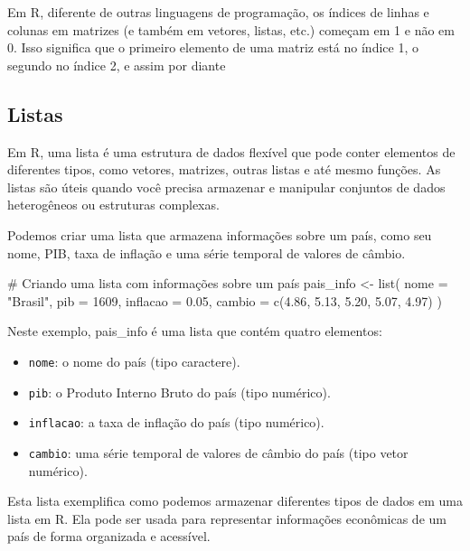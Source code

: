 \documentclass[
  portuguese,
  letterpaper,
  DIV=11,
  numbers=noendperiod]{scrreprt}
\newenvironment{Shaded}{\begin{snugshade}}{\end{snugshade}}
\newcommand{\AttributeTok}[1]{\textcolor[rgb]{0.40,0.45,0.13}{#1}}
\newcommand{\CommentTok}[1]{\textcolor[rgb]{0.37,0.37,0.37}{#1}}
\newcommand{\DecValTok}[1]{\textcolor[rgb]{0.68,0.00,0.00}{#1}}
\newcommand{\FloatTok}[1]{\textcolor[rgb]{0.68,0.00,0.00}{#1}}
\newcommand{\FunctionTok}[1]{\textcolor[rgb]{0.28,0.35,0.67}{#1}}
\newcommand{\NormalTok}[1]{\textcolor[rgb]{0.00,0.23,0.31}{#1}}
\newcommand{\OtherTok}[1]{\textcolor[rgb]{0.00,0.23,0.31}{#1}}
\newcommand{\StringTok}[1]{\textcolor[rgb]{0.13,0.47,0.30}{#1}}
\providecommand{\tightlist}{%
  \setlength{\itemsep}{0pt}\setlength{\parskip}{0pt}}
\theoremstyle{definition}
\theoremstyle{remark}
\begin{document}
Em R, diferente de outras linguagens de programação, os índices de
linhas e colunas em matrizes (e também em vetores, listas, etc.) começam
em 1 e não em 0. Isso significa que o primeiro elemento de uma matriz
está no índice 1, o segundo no índice 2, e assim por diante

\subsection{Listas}\label{listas}

Em R, uma lista é uma estrutura de dados flexível que pode conter
elementos de diferentes tipos, como vetores, matrizes, outras listas e
até mesmo funções. As listas são úteis quando você precisa armazenar e
manipular conjuntos de dados heterogêneos ou estruturas complexas.

Podemos criar uma lista que armazena informações sobre um país, como seu
nome, PIB, taxa de inflação e uma série temporal de valores de câmbio.

\begin{Shaded}
\begin{Highlighting}[]
\CommentTok{\# Criando uma lista com informações sobre um país}
\NormalTok{pais\_info }\OtherTok{\textless{}{-}} \FunctionTok{list}\NormalTok{(}
  \AttributeTok{nome =} \StringTok{"Brasil"}\NormalTok{,}
  \AttributeTok{pib =} \DecValTok{1609}\NormalTok{,}
  \AttributeTok{inflacao =} \FloatTok{0.05}\NormalTok{,}
  \AttributeTok{cambio =} \FunctionTok{c}\NormalTok{(}\FloatTok{4.86}\NormalTok{, }\FloatTok{5.13}\NormalTok{, }\FloatTok{5.20}\NormalTok{, }\FloatTok{5.07}\NormalTok{, }\FloatTok{4.97}\NormalTok{)}
\NormalTok{)}
\end{Highlighting}
\end{Shaded}

Neste exemplo, pais\_info é uma lista que contém quatro elementos:

\begin{itemize}
\tightlist
\item
  \texttt{nome}: o nome do país (tipo caractere).
\item
  \texttt{pib}: o Produto Interno Bruto do país (tipo numérico).
\item
  \texttt{inflacao}: a taxa de inflação do país (tipo numérico).
\item
  \texttt{cambio}: uma série temporal de valores de câmbio do país (tipo
  vetor numérico).
\end{itemize}

Esta lista exemplifica como podemos armazenar diferentes tipos de dados
em uma lista em R. Ela pode ser usada para representar informações
econômicas de um país de forma organizada e acessível.
\end{document}
